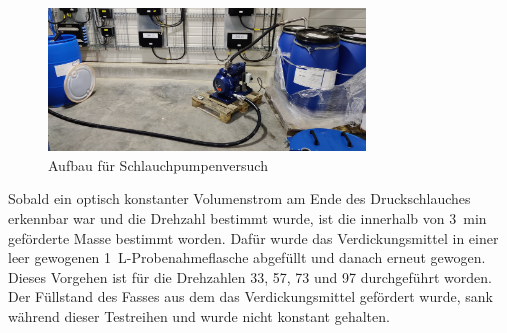 \begin{figure}[h!]
	\centering
	\includegraphics[width=0.75\textwidth]{img/pumpenversuch}
	\caption{Aufbau für Schlauchpumpenversuch}
	\label{fig:pumpentest}
\end{figure}
\FloatBarrier

Sobald ein optisch konstanter Volumenstrom am Ende des Druckschlauches erkennbar war und die Drehzahl bestimmt wurde, ist die innerhalb von \SI{3}{\minute} geförderte Masse bestimmt worden. Dafür wurde das Verdickungsmittel in einer leer gewogenen \SI{1}{\liter}-Probenahmeflasche abgefüllt und danach erneut gewogen. Dieses Vorgehen ist für die Drehzahlen 33, 57, 73 und \SI{97}{\rpm} durchgeführt worden. Der Füllstand des Fasses aus dem das Verdickungsmittel gefördert wurde, sank während dieser Testreihen und wurde nicht konstant gehalten. 

